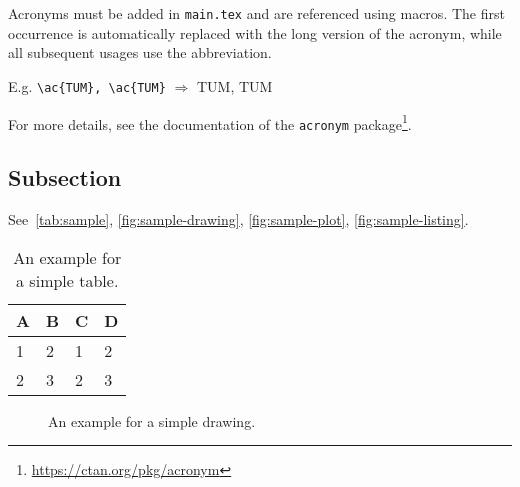 Acronyms must be added in \texttt{main.tex} and are referenced using macros. The first occurrence is automatically replaced with the long version of the acronym, while all subsequent usages use the abbreviation.

E.g. \texttt{\textbackslash ac\{TUM\}, \textbackslash ac\{TUM\}} $\Rightarrow$ \ac{TUM}, \ac{TUM}

For more details, see the documentation of the \texttt{acronym} package\footnote{\url{https://ctan.org/pkg/acronym}}.
\subsection{Subsection}

See~\autoref{tab:sample}, \autoref{fig:sample-drawing}, \autoref{fig:sample-plot}, \autoref{fig:sample-listing}.

\begin{table}[htpb]
  \caption[Example table]{An example for a simple table.}\label{tab:sample}
  \centering
  \begin{tabular}{l l l l}
    \toprule
      A & B & C & D \\
    \midrule
      1 & 2 & 1 & 2 \\
      2 & 3 & 2 & 3 \\
    \bottomrule
  \end{tabular}
\end{table}

\begin{figure}[htpb]
  \centering
  \caption[Example drawing]{An example for a simple drawing.}\label{fig:sample-drawing}
\end{figure}

